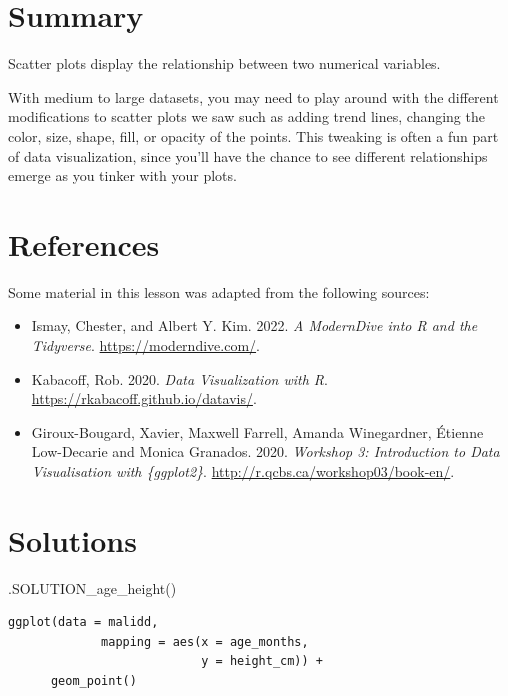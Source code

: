 \documentclass[
  letterpaper,
  DIV=11,
  numbers=noendperiod]{scrreprt}
\newenvironment{Shaded}{\begin{snugshade}}{\end{snugshade}}
\newcommand{\FunctionTok}[1]{\textcolor[rgb]{0.28,0.35,0.67}{#1}}
\newcommand{\NormalTok}[1]{\textcolor[rgb]{0.00,0.23,0.31}{#1}}
\providecommand{\tightlist}{%
  \setlength{\itemsep}{0pt}\setlength{\parskip}{0pt}}\usepackage{longtable,booktabs,array}
\begin{document}
\section{Summary}\label{summary}

Scatter plots display the relationship between two numerical variables.

With medium to large datasets, you may need to play around with the
different modifications to scatter plots we saw such as adding trend
lines, changing the color, size, shape, fill, or opacity of the points.
This tweaking is often a fun part of data visualization, since you'll
have the chance to see different relationships emerge as you tinker with
your plots.

\section*{References}\label{references-13}


Some material in this lesson was adapted from the following sources:

\begin{itemize}
\tightlist
\item
  Ismay, Chester, and Albert Y. Kim. 2022. \emph{A ModernDive into R and
  the Tidyverse}. \url{https://moderndive.com/}.
\item
  Kabacoff, Rob. 2020. \emph{Data Visualization with R}.
  \url{https://rkabacoff.github.io/datavis/}.
\item
  Giroux-Bougard, Xavier, Maxwell Farrell, Amanda Winegardner, Étienne
  Low-Decarie and Monica Granados. 2020. \emph{Workshop 3: Introduction
  to Data Visualisation with \{ggplot2\}}.
  \url{http://r.qcbs.ca/workshop03/book-en/}.
\end{itemize}

\section{Solutions}\label{solutions-10}

\begin{Shaded}
\begin{Highlighting}[]
\FunctionTok{.SOLUTION\_age\_height}\NormalTok{()}
\end{Highlighting}
\end{Shaded}

\begin{verbatim}
ggplot(data = malidd,
             mapping = aes(x = age_months, 
                           y = height_cm)) +
      geom_point()
\end{verbatim}
\end{document}
